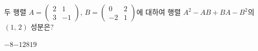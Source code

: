 두 행렬 $A=\begin{pmatrix} 2 & 1 \\ 3 & -1 \end{pmatrix}$, $B=\begin{pmatrix} 0 & 2 \\ -2 & 1 \end{pmatrix}$에 대하여 행렬 $A^2-AB+BA-B^2$의 $(1,\,2)$ 성분은?
\begin{choices32}{$-8$}{$-1$}{$2$}{$8$}{$19$}\end{choices32}
